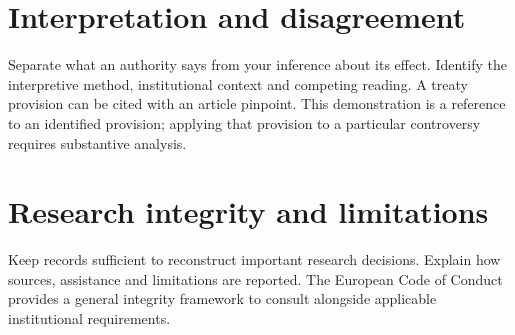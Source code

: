 \section{Interpretation and disagreement}
Separate what an authority says from your inference about its effect. Identify
the interpretive method, institutional context and competing reading. A treaty
provision can be cited with an article pinpoint.
This demonstration is a reference to an identified provision; applying that
provision to a particular controversy requires substantive analysis.

\section{Research integrity and limitations}
Keep records sufficient to reconstruct important research decisions. Explain
how sources, assistance and limitations are reported. The European Code of
Conduct provides a general integrity framework to consult alongside applicable
institutional requirements.

